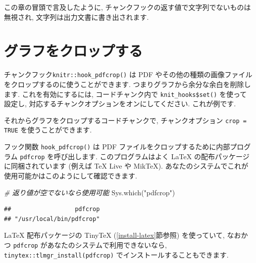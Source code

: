 \documentclass[
  11pt,
]{bxjsreport}
\newenvironment{Shaded}{\begin{snugshade}}{\end{snugshade}}
\newcommand{\AttributeTok}[1]{\textcolor[rgb]{0.77,0.63,0.00}{#1}}
\newcommand{\CommentTok}[1]{\textcolor[rgb]{0.56,0.35,0.01}{\textit{#1}}}
\newcommand{\FunctionTok}[1]{\textcolor[rgb]{0.00,0.00,0.00}{#1}}
\newcommand{\NormalTok}[1]{#1}
\newcommand{\SpecialCharTok}[1]{\textcolor[rgb]{0.00,0.00,0.00}{#1}}
\newcommand{\StringTok}[1]{\textcolor[rgb]{0.31,0.60,0.02}{#1}}
\begin{document}
この章の冒頭で言及したように, チャンクフックの返す値で文字列でないものは無視され, 文字列は出力文書に書き出されます.

\hypertarget{crop-plot}{%
\section{グラフをクロップする}\label{crop-plot}}

チャンクフック\texttt{knitr::hook\_pdfcrop()} は PDF やその他の種類の画像ファイルをクロップするのに使うことができます. つまりグラフから余分な余白を削除します. これを有効にするには, コードチャンク内で \texttt{knit\_hooks\$set()} を使って設定し, 対応するチャンクオプションをオンにしてください. これが例です.

\begin{Shaded}
\end{Shaded}

それからグラフをクロップするコードチャンクで, チャンクオプション \texttt{crop = TRUE} を使うことができます.

フック関数 \texttt{hook\_pdfcrop()} は PDF ファイルをクロップするために内部プログラム \texttt{pdfcrop} を呼び出します. このプログラムはよく LaTeX の配布パッケージに同梱されています (例えば TeX Live や MikTeX). あなたのシステムでこれが使用可能かはこのようにして確認できます.

\begin{Shaded}
\begin{Highlighting}[numbers=left,,]
\CommentTok{\# 返り値が空でないなら使用可能}
\FunctionTok{Sys.which}\NormalTok{(}\StringTok{"pdfcrop"}\NormalTok{)}
\end{Highlighting}
\end{Shaded}

\begin{verbatim}
##                  pdfcrop 
## "/usr/local/bin/pdfcrop"
\end{verbatim}

LaTeX 配布パッケージの TinyTeX (\ref{install-latex}節参照) を使っていて, なおかつ \texttt{pdfcrop} があなたのシステムで利用できないなら, \texttt{tinytex::tlmgr\_install(\textquotesingle{}pdfcrop\textquotesingle{})} でインストールすることもできます.
\end{document}
